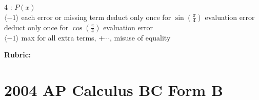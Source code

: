 \documentclass[12pt,addpoints,answers]{exam}
\begin{document}
\begin{questions}
\begin{solution}
\begin{parts}
4 : $P(x)$\\
$\langle-1\rangle$ each error or missing term deduct only once for $\sin \left(\frac{\pi}{4}\right)$ evaluation error\\
deduct only once for $\cos \left(\frac{\pi}{4}\right)$ evaluation error\\
$\langle-1\rangle$ max for all extra terms, $+\cdots$, misuse of equality
\end{parts}
\par\medskip
\textbf{Rubric:}\par
{}
\end{solution}

\end{questions}

\section*{2004 AP Calculus BC Form B}
\end{document}

